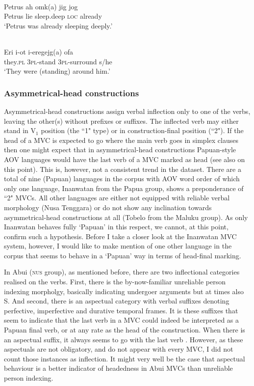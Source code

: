 \ea \label{}
\\
\gll Petrus ah omk(a) jig jog \\
Petrus lie sleep.deep \textsc{loc} already \\
\glft `Petrus was already sleeping deeply.’ \\ 
\z

\ea \label{}
\\
\gll Eri i-ot i-eregejg(a) ofa \\
they.\textsc{pl} 3\textsc{pl}-stand 3\textsc{pl}-surround s/he \\
\glft `They were (standing) around him.’\\ 
\z

\subsubsection{Asymmetrical-head constructions} \label{sec:asymmetrical}

Asymmetrical-head constructions assign verbal inflection only to one of the verbs, leaving the other(s) without prefixes or suffixes. The inflected verb may either stand in V$_1$ position (the ``1" type) or in construction-final position (``2"). If the head of a MVC is expected to go where the main verb goes in simplex clauses then one might expect that in asymmetrical-head constructions Papuan-style AOV languages would have the last verb of a MVC marked as head (see also \citealt{Durie1997} on this point). This is, however, not a consistent trend in the dataset. There are a total of nine (Papuan) languages in the corpus with AOV word order of which only one language, Inanwatan from the Papua group, shows a preponderance of ``2" MVCs. All other languages are either not equipped with reliable verbal morphology (Nusa Tenggara) or do not show any inclination towards asymmetrical-head constructions at all (Tobelo from the Maluku group). As only Inanwatan behaves fully `Papuan' in this respect, we cannot, at this point, confirm such a hypothesis. Before I take a closer look at the Inanwatan MVC system, however, I would like to make mention of one other language in the corpus that seems to behave in a `Papuan' way in terms of head-final marking.

In Abui (\textsc{nus} group), as mentioned before, there are two inflectional categories realised on the verbs. First, there is the by-now-familiar unreliable person indexing morpholgy, basically indicating undergoer arguments but at times also S. And second, there is an aspectual category with verbal suffixes denoting perfective, imperfective and durative temporal frames. It is these suffixes that seem to indicate that the last verb in a MVC could indeed be interpreted as a Papuan final verb, or at any rate as the head of the construction. When there is an aspectual suffix, it always seems to go with the last verb \citep[350]{kratochvil2007grammar}. However, as these aspectuals are not obligatory, and do not appear with every MVC, I did not count those instances as inflection. It might very well be the case that aspectual behaviour is a better indicator of headedness in Abui MVCs than unreliable person indexing.  

